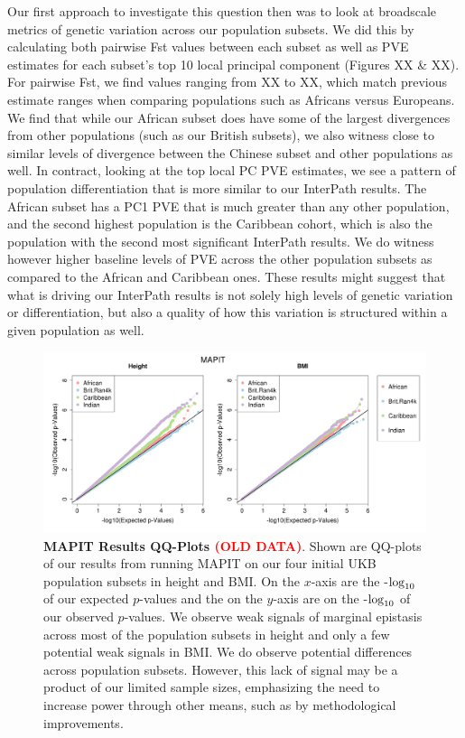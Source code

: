 \documentclass[12pt, a4paper]{article}
\def\log{{\rm log}}
\newcommand{\red}[1]{\textcolor{red}{#1}}
\begin{document}
Our first approach to investigate this question then was to look at broadscale metrics of genetic variation across our population subsets. We did this by calculating both pairwise Fst values between each subset as well as PVE estimates for each subset's top 10 local principal component (Figures XX \& XX). For pairwise Fst, we find values ranging from XX to XX, which match previous estimate ranges when comparing populations such as Africans versus Europeans. We find that while our African subset does have some of the largest divergences from other populations (such as our British subsets), we also witness close to similar levels of divergence between the Chinese subset and other populations as well. In contract, looking at the top local PC PVE estimates, we see a pattern of population differentiation that is more similar to our InterPath results. The African subset has a PC1 PVE that is much greater than any other population, and the second highest population is the Caribbean cohort, which is also the population with the second most significant InterPath results. We do witness however higher baseline levels of PVE across the other population subsets as compared to the African and Caribbean ones. These results might suggest that what is driving our InterPath results is not solely high levels of genetic variation or differentiation, but also a quality of how this variation is structured within a given population as well.

\begin{figure}[htbp]
\centering
\includegraphics[scale=.35]{Images/InterPath_Main_Figure_MAPIT_vs1.png}
\caption[TBD]{\textbf{MAPIT Results QQ-Plots \red{(OLD DATA)}}. Shown are QQ-plots of our results from running MAPIT on our four initial UKB population subsets in height and BMI. On the $x$-axis are the -$\log_{10}$ of our expected $p$-values and the on the $y$-axis are on the -$\log_{10}$ of our observed $p$-values. We observe weak signals of marginal epistasis across most of the population subsets in height and only a few potential weak signals in BMI. We do observe potential differences across population subsets. However, this lack of signal may be a product of our limited sample sizes, emphasizing the need to increase power through other means, such as by methodological improvements.}
\label{InterPath-Main-Figure-Fst}
\end{figure}
\end{document}
